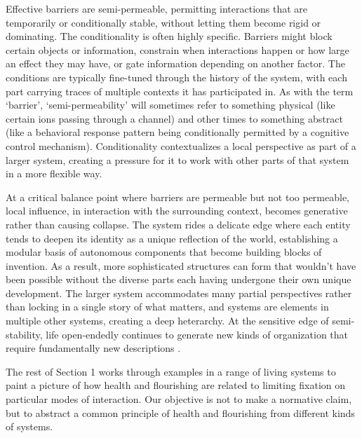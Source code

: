 \documentclass[11pt]{article}
\newif\ifmarkchanges
\newcommand{\rev}[2]{\leavevmode\linelabel{#1:a}\ifmarkchanges{\color{blue}#2}\else#2\fi\linelabel{#1:b}}
\begin{document}
Effective barriers are semi-permeable, permitting interactions that are temporarily or conditionally stable, without letting them become rigid or dominating. The conditionality is often highly specific. Barriers might block certain objects or information, constrain when interactions happen or how large an effect they may have, or gate information depending on another factor. The conditions are typically fine-tuned through the history of the system, with each part carrying traces of multiple contexts it has participated in. As with the term `barrier', `semi-permeability' will sometimes refer to something physical (like certain ions passing through a channel) and other times to something abstract (like a behavioral response pattern being conditionally permitted by a cognitive control mechanism). Conditionality contextualizes a local perspective as part of a larger system, creating a pressure for it to work with other parts of that system in a more flexible way. 


At a critical balance point where barriers are permeable but not too permeable, local influence, in interaction with the surrounding context, becomes generative rather than causing collapse. The system rides a delicate edge where each entity tends to deepen its identity as a unique reflection of the world, establishing a modular basis of autonomous components that become building blocks of invention. As a result, more sophisticated structures can form that wouldn't have been possible without the diverse parts each having undergone their own unique development. The larger system accommodates many partial perspectives rather than locking in a single story of what matters, and systems are elements in multiple other systems, creating a deep heterarchy. At the sensitive edge of semi-stability, life open-endedly continues to generate new kinds of organization that require fundamentally new descriptions \citep{kauffman1993origins, stanley2017open, langton1990computation, simon1962architecture, schrodinger1944what, prigogine1984order, maturana2012autopoiesis}.

The rest of Section 1 works through examples in a range of living systems to paint a picture of how health and flourishing are related to limiting fixation on particular modes of interaction. \rev{status}{Our objective is not to make a normative claim, but to abstract a common principle of health and flourishing from different kinds of systems.}
\end{document}
